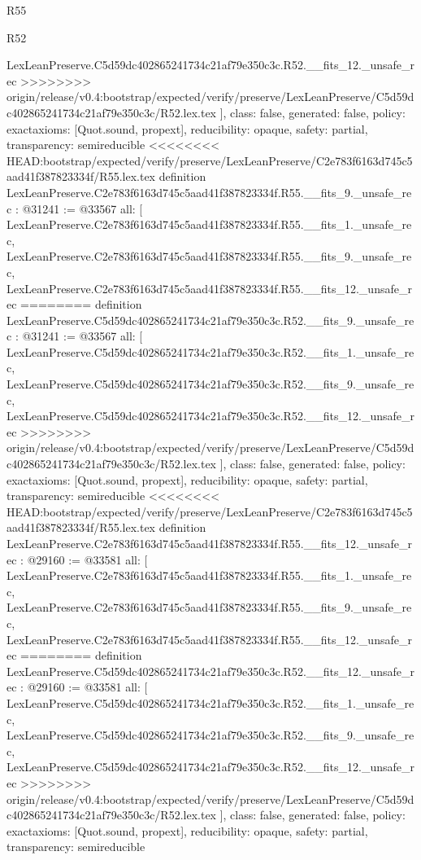 \begin{lexlean}{R55}
\begin{lexlean}{R52}
\begin{coremodule}
{{{{{{{{{{{{{{{{{{{{{{{{{{{{{{{{{{{{{{{{{{{{{{{{{{{{{{{{{{{{{{{{{{{{{{{{{{{{{{{{{{{{{{{{{{{{{{{{{{{{{{{{{{{{{{{{{{{{{{{{{{{{{{{{{{{{{{{{{{{{{{{{{{{{{{{{{{{{    LexLeanPreserve.C5d59dc402865241734c21af79e350c3c.R52.__fits_12._unsafe_rec
>>>>>>>> origin/release/v0.4:bootstrap/expected/verify/preserve/LexLeanPreserve/C5d59dc402865241734c21af79e350c3c/R52.lex.tex
  ],
  class: false,
  generated: false,
  policy: exact{axioms: [Quot.sound, propext]},
  reducibility: opaque{},
  safety: partial,
  transparency: semireducible
}
<<<<<<<< HEAD:bootstrap/expected/verify/preserve/LexLeanPreserve/C2e783f6163d745c5aad41f387823334f/R55.lex.tex
definition LexLeanPreserve.C2e783f6163d745c5aad41f387823334f.R55.__fits_9._unsafe_rec : @31241 := @33567 {
  all: [
    LexLeanPreserve.C2e783f6163d745c5aad41f387823334f.R55.__fits_1._unsafe_rec,
    LexLeanPreserve.C2e783f6163d745c5aad41f387823334f.R55.__fits_9._unsafe_rec,
    LexLeanPreserve.C2e783f6163d745c5aad41f387823334f.R55.__fits_12._unsafe_rec
========
definition LexLeanPreserve.C5d59dc402865241734c21af79e350c3c.R52.__fits_9._unsafe_rec : @31241 := @33567 {
  all: [
    LexLeanPreserve.C5d59dc402865241734c21af79e350c3c.R52.__fits_1._unsafe_rec,
    LexLeanPreserve.C5d59dc402865241734c21af79e350c3c.R52.__fits_9._unsafe_rec,
    LexLeanPreserve.C5d59dc402865241734c21af79e350c3c.R52.__fits_12._unsafe_rec
>>>>>>>> origin/release/v0.4:bootstrap/expected/verify/preserve/LexLeanPreserve/C5d59dc402865241734c21af79e350c3c/R52.lex.tex
  ],
  class: false,
  generated: false,
  policy: exact{axioms: [Quot.sound, propext]},
  reducibility: opaque{},
  safety: partial,
  transparency: semireducible
}
<<<<<<<< HEAD:bootstrap/expected/verify/preserve/LexLeanPreserve/C2e783f6163d745c5aad41f387823334f/R55.lex.tex
definition LexLeanPreserve.C2e783f6163d745c5aad41f387823334f.R55.__fits_12._unsafe_rec : @29160 := @33581 {
  all: [
    LexLeanPreserve.C2e783f6163d745c5aad41f387823334f.R55.__fits_1._unsafe_rec,
    LexLeanPreserve.C2e783f6163d745c5aad41f387823334f.R55.__fits_9._unsafe_rec,
    LexLeanPreserve.C2e783f6163d745c5aad41f387823334f.R55.__fits_12._unsafe_rec
========
definition LexLeanPreserve.C5d59dc402865241734c21af79e350c3c.R52.__fits_12._unsafe_rec : @29160 := @33581 {
  all: [
    LexLeanPreserve.C5d59dc402865241734c21af79e350c3c.R52.__fits_1._unsafe_rec,
    LexLeanPreserve.C5d59dc402865241734c21af79e350c3c.R52.__fits_9._unsafe_rec,
    LexLeanPreserve.C5d59dc402865241734c21af79e350c3c.R52.__fits_12._unsafe_rec
>>>>>>>> origin/release/v0.4:bootstrap/expected/verify/preserve/LexLeanPreserve/C5d59dc402865241734c21af79e350c3c/R52.lex.tex
  ],
  class: false,
  generated: false,
  policy: exact{axioms: [Quot.sound, propext]},
  reducibility: opaque{},
  safety: partial,
  transparency: semireducible
}}}}}}}}}}}}}}}}}}}}}}}}}}}}}}}}}}}}}}}}}}}}}}}}}}}}}}}}}}}}}}}}}}}}}}}}}}}}}}}}}}}}}}}}}}}}}}}}}}}}}}}}}}}}}}}}}}}}}}}}}}}}}}}}}}}}}}}}}}}}}}}}}}}}}}}}}}}}}}
\end{coremodule}
\end{lexlean}
\end{lexlean}
